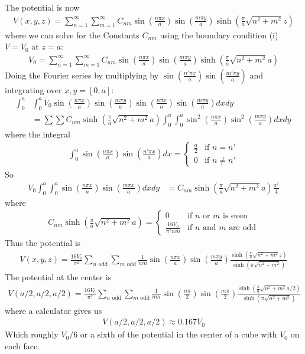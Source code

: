 \documentclass[../main.tex]{subfiles}
\begin{document}
The potential is now
\begin{align*}
    V(x,y,z) = \sum_{n=1}^\infty \sum_{m=1}^\infty C_{nm} \sin(\frac{n\pi x}{a}) \sin(\frac{m\pi y}{a}) \sinh(\frac{\pi}{a} \sqrt{n^2 + m^2} z)
\end{align*}
where we can solve for the Constants $C_{nm}$ using the boundary condition (i) $V = V_0$ at $z = a$:
\begin{align*}
    V_0 = \sum_{n=1}^\infty \sum_{m=1}^\infty C_{nm} \sin(\frac{n\pi x}{a}) \sin(\frac{m\pi y}{a}) \sinh(\frac{\pi}{a} \sqrt{n^2 + m^2} a)
\end{align*}
Doing the Fourier series by multiplying by $\sin(\frac{n'\pi x}{a}) \sin(\frac{m'\pi y}{a})$ and integrating over $x,y = [0,a]$:
\begin{align*}
    \int_0^a& \int_0^a V_0 \sin(\frac{n\pi x}{a}) \sin(\frac{m\pi y}{a}) \sin(\frac{n\pi x}{a}) \sin(\frac{m\pi y}{a}) dx dy \\
    &= \sum\sum C_{nm} \sinh(\frac{\pi}{a} \sqrt{n^2 + m^2} a) \int_0^a \int_0^a \sin^2(\frac{n\pi x}{a}) \sin^2(\frac{m\pi y}{a}) dx dy
\end{align*}
where the integral
\begin{align*}
    \int_0^a \sin(\frac{n\pi x}{a})\sin(\frac{n'\pi x}{a}) dx = \begin{cases}
        \frac{a}{2} & \text{if } n = n' \\
        0 & \text{if } n \neq n'
    \end{cases}
\end{align*}
So
\begin{align*}
    V_0 \int_0^a \int_0^a \sin(\frac{n\pi x}{a}) \sin(\frac{m\pi x}{a}) dx dy &= C_{nm} \sinh(\frac{\pi}{a} \sqrt{n^2 + m^2} a) \frac{a^2}{4}
\end{align*}
where
\begin{align*}
    C_{nm} \sinh(\frac{\pi}{a} \sqrt{n^2 + m^2} a) = \begin{cases}
        0 & \text{if } n \text{ or } m \text{ is even} \\
        \frac{16V_0}{\pi^2 n m} & \text{if } n \text{ and } m \text{ are odd}
    \end{cases}
\end{align*}
Thus the potential is
\begin{align*}
    \boxed{
        V(x,y,z) = \frac{16 V_0}{\pi^2} \sum_{n \text{ odd}} \sum_{m \text{ odd}} \frac{1}{nm} \sin(\frac{n\pi x}{a}) \sin(\frac{m\pi y}{a})
            \frac{\sinh(\frac{\pi}{a} \sqrt{n^2 + m^2} z)}{\sinh(\pi\sqrt{n^2 + m^2})}
    }
\end{align*}
The potential at the center is
\begin{align*}
    V(a/2, a/2, a/2) = \frac{16 V_0}{\pi^2} \sum_{n \text{ odd}} \sum_{m \text{ odd}} \frac{1}{nm} \sin(\frac{n\pi}{2}) \sin(\frac{m\pi}{2})
            \frac{\sinh(\frac{\pi}{a} \sqrt{n^2 + m^2} a/2)}{\sinh(\pi\sqrt{n^2 + m^2})}
\end{align*}
where a calculator gives us
\begin{align*}
    V(a/2, a/2, a/2) \approx 0.167 V_0
\end{align*}
Which roughly $V_0/6$ or a sixth of the potential in the center of a cube with $V_0$ on each face.
\end{document}

